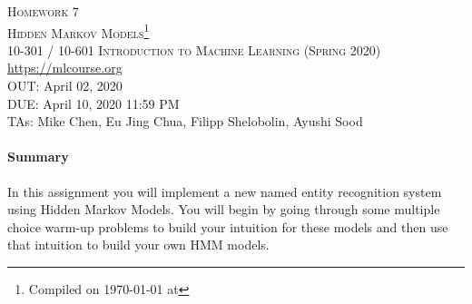 \documentclass[11pt,addpoints,answers]{exam}
\title{\textsc{\hwName}} %
\author{}
\date{}
\date{}
\numberwithin{equation}{section} %
\numberwithin{figure}{section} %
\numberwithin{table}{section} %
\newcommand{\courseNum}{10-301 / 10-601}
\newcommand{\courseName}{Introduction to Machine Learning}
\newcommand{\courseSem}{Spring 2020}
\newcommand{\courseUrl}{\url{https://mlcourse.org}}
\newcommand{\hwNum}{Homework 7}
\newcommand{\hwTopic}{Hidden Markov Models}
\newcommand{\outDate}{April 02, 2020}
\newcommand{\dueDate}{April 10, 2020 11:59 PM}
\newcommand{\taNames}{Mike Chen, Eu Jing Chua, Filipp Shelobolin, Ayushi Sood}
\begin{document}
\section*{}
\begin{center}
  \textsc{\LARGE \hwNum} \\
  \textsc{\LARGE \hwTopic\footnote{Compiled on \today{} at \currenttime{}}} \\
  \vspace{1em}
  \textsc{\large \courseNum{} \courseName{} (\courseSem)} \\
  \courseUrl\\
  \vspace{1em}
  OUT: \outDate \\
  DUE: \dueDate \\
  TAs: \taNames
\end{center}


\begin{notebox}
\paragraph{Summary} In this assignment you will implement a new named entity recognition system using Hidden Markov Models. You will begin by going through some multiple choice warm-up problems to build your intuition for these models and then use that intuition to build your own HMM models.
\end{notebox}
\end{document}
